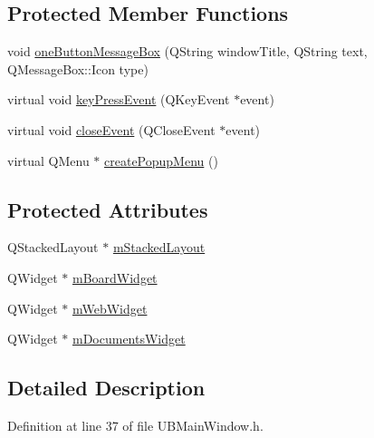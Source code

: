\subsection*{Protected Member Functions}
\begin{DoxyCompactItemize}
\item 
void \hyperlink{class_u_b_main_window_a907ee78e907b30203375117b5af1848f}{one\-Button\-Message\-Box} (Q\-String window\-Title, Q\-String text, Q\-Message\-Box\-::\-Icon type)
\item 
virtual void \hyperlink{class_u_b_main_window_a03476c76604b877356f244c1ae1dc6b5}{key\-Press\-Event} (Q\-Key\-Event $\ast$event)
\item 
virtual void \hyperlink{class_u_b_main_window_a05fb5c9e836b00adc97ffd42f1baec3f}{close\-Event} (Q\-Close\-Event $\ast$event)
\item 
virtual Q\-Menu $\ast$ \hyperlink{class_u_b_main_window_a4167662c4f08ffdecff083c9f7e01de3}{create\-Popup\-Menu} ()
\end{DoxyCompactItemize}
\subsection*{Protected Attributes}
\begin{DoxyCompactItemize}
\item 
Q\-Stacked\-Layout $\ast$ \hyperlink{class_u_b_main_window_a2c37b6336535a741661bbeb7e1375d8e}{m\-Stacked\-Layout}
\item 
Q\-Widget $\ast$ \hyperlink{class_u_b_main_window_aa64036e9f2bb881efda179dc8456dafb}{m\-Board\-Widget}
\item 
Q\-Widget $\ast$ \hyperlink{class_u_b_main_window_a795096ff1d8e22ced78502c36a540eea}{m\-Web\-Widget}
\item 
Q\-Widget $\ast$ \hyperlink{class_u_b_main_window_ab0686e7ba525d0d7dc7fb86b707ac363}{m\-Documents\-Widget}
\end{DoxyCompactItemize}


\subsection{Detailed Description}


Definition at line 37 of file U\-B\-Main\-Window.\-h.



